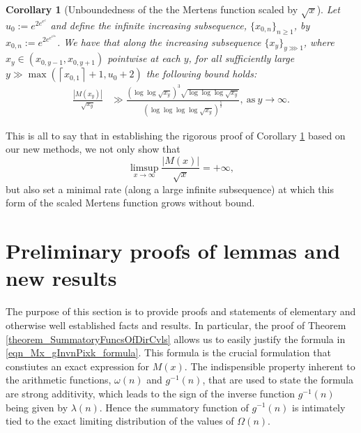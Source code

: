 \documentclass[11pt,reqno,a4letter]{article}
\numberwithin{figure}{section}
\numberwithin{table}{section}
\newcommand{\floor}[1]{\left\lfloor #1 \right\rfloor}
\newcommand{\ceiling}[1]{\left\lceil #1 \right\rceil}
\theoremstyle{plain}
\newtheorem{cor}[theorem]{Corollary}
\numberwithin{theorem}{section}
\theoremstyle{definition}
\newcommand{\SuccSim}[0]{\overset{_{\scriptsize{\blacktriangle}}}{\succsim}}
\renewcommand{\SuccSim}[0]{\ensuremath{\gg}}
\begin{document}
\begin{cor}[Unboundedness of the the Mertens function scaled by $\sqrt{x}$] 
\label{cor_ThePipeDreamResult_v1} 
Let $u_0 := e^{2e^{e^{e}}}$ and define the infinite increasing subsequence, 
$\{x_{0,n}\}_{n \geq 1}$, by $x_{0,n} := e^{2e^{e^{e^{2n}}}}$. 
We have that along the increasing subsequence $\{x_y\}_{y \ggg 1}$, where 
$x_y \in \left(x_{0,y-1}, x_{0,y+1}\right)$ pointwise at each $y$, for all sufficiently large 
$y \gg \max\left(\ceiling{x_{0,1}}+1, u_0+2\right)$ the following bound holds: 
\begin{align*} 
\frac{|M(x_y)|}{\sqrt{x_y}} & \SuccSim 
     \frac{(\log\log \sqrt{x_y})^{3} \sqrt{\log\log\log \sqrt{x_y}}}{ 
     (\log\log\log\log \sqrt{x_y})^{\frac{5}{2}}}, \mathrm{\ as\ } y \rightarrow \infty. 
\end{align*} 
\end{cor} 

This is all to say that in establishing the rigorous proof of 
Corollary \ref{cor_ThePipeDreamResult_v1} 
based on our new methods, we not only show that 
\[
\limsup_{x \rightarrow \infty} \frac{|M(x)|}{\sqrt{x}} = +\infty, 
\]
but also set a minimal rate (along a large infinite subsequence) at which this form of the 
scaled Mertens function grows without bound. 


\newpage 
\section{Preliminary proofs of lemmas and new results} 
\label{Section_PrelimProofs_Config} 

The purpose of this section is to provide proofs and statements 
of elementary and otherwise well established facts and results. In particular, the proof of 
Theorem \ref{theorem_SummatoryFuncsOfDirCvls} allows us to easily justify the formula in 
\eqref{eqn_Mx_gInvnPixk_formula}. 
This formula is the crucial formulation that constiutes an exact expression for $M(x)$. 
The indispensible property inherent to the arithmetic functions, $\omega(n)$ and $g^{-1}(n)$, 
that are used to state the formula are strong additivity, which leads to the sign of the inverse function 
$g^{-1}(n)$ being given by $\lambda(n)$. Hence the summatory function of $g^{-1}(n)$ is 
intimately tied to the exact limiting 
distribution of the values of $\Omega(n)$. 
\end{document}
